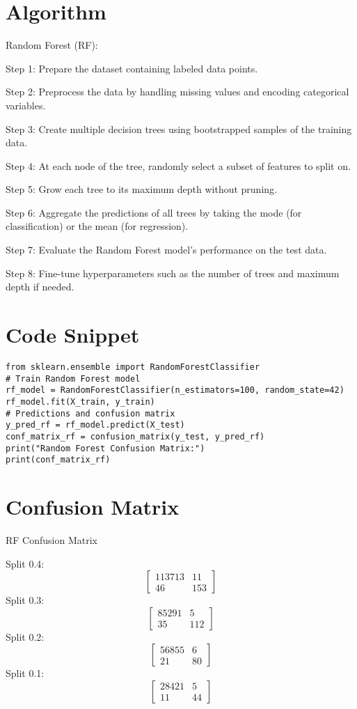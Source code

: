 \documentclass[12pt,a4paper]{report}
\begin{document}
\section{Algorithm}
Random Forest (RF):\par
Step 1: Prepare the dataset containing labeled data points.\par
Step 2: Preprocess the data by handling missing values and encoding categorical variables.\par
Step 3: Create multiple decision trees using bootstrapped samples of the training data.\par
Step 4: At each node of the tree, randomly select a subset of features to split on.\par
Step 5: Grow each tree to its maximum depth without pruning.\par
Step 6: Aggregate the predictions of all trees by taking the mode (for classification) or the mean (for regression).\par
 Step 7: Evaluate the Random Forest model's performance on the test data.\par
Step 8: Fine-tune hyperparameters such as the number of trees and maximum depth if needed.\par 

\section{Code Snippet}
\begin{lstlisting}
from sklearn.ensemble import RandomForestClassifier
# Train Random Forest model
rf_model = RandomForestClassifier(n_estimators=100, random_state=42)
rf_model.fit(X_train, y_train)
# Predictions and confusion matrix
y_pred_rf = rf_model.predict(X_test)
conf_matrix_rf = confusion_matrix(y_test, y_pred_rf)
print("Random Forest Confusion Matrix:")
print(conf_matrix_rf)
\end{lstlisting}

\section{Confusion Matrix}
RF Confusion Matrix\par
\vspace{0.5cm}
Split 0.4:
\[
\begin{bmatrix}
  113713 & 11\\
  46 & 153
\end{bmatrix}
\]
Split 0.3:
\[
\begin{bmatrix}
  85291 & 5\\
  35 & 112
\end{bmatrix}
\]
Split 0.2:
\[
\begin{bmatrix}
  56855 & 6\\
  21 & 80
\end{bmatrix}
\]
Split 0.1:
\[
\begin{bmatrix}
  28421 & 5\\
  11 & 44
\end{bmatrix}
\]
\end{document}
